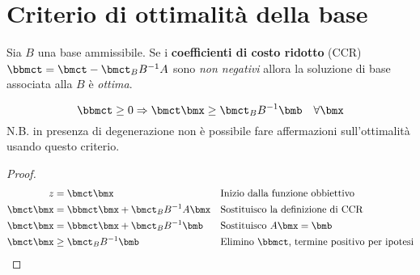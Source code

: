 \documentclass[\main/main.tex]{subfiles}
\begin{document}
\section{Criterio di ottimalità della base}
\begin{theorem}
  Sia $B$ una base ammissibile. Se i \textbf{coefficienti di costo ridotto} (CCR) $\bbmct = \bmct - \bmct_B B^{-1} A$ sono \textit{non negativi} allora la soluzione di base associata alla $B$ è \textit{ottima}.

  \[
    \bbmct \geq 0 \Rightarrow \bmct \bmx \geq \bmct_B B^{-1}\bmb \quad \forall \bmx
  \]
  N.B. in presenza di degenerazione non è possibile fare affermazioni sull'ottimalità usando questo criterio.
\end{theorem}


\begin{proof}
  \begin{align*}
    z          & =\bmct \bmx                         &  & \text{Inizio dalla funzione obbiettivo}               \\
    \bmct \bmx & = \bbmct\bmx + \bmct_B B^{-1} A\bmx &  & \text{Sostituisco la definizione di CCR}              \\
    \bmct \bmx & = \bbmct\bmx + \bmct_B B^{-1} \bmb  &  & \text{Sostituisco $A\bmx = \bmb$}                     \\
    \bmct \bmx & \geq \bmct_B B^{-1} \bmb            &  & \text{Elimino $\bbmct$, termine positivo per ipotesi}
  \end{align*}
\end{proof}
\end{document}

